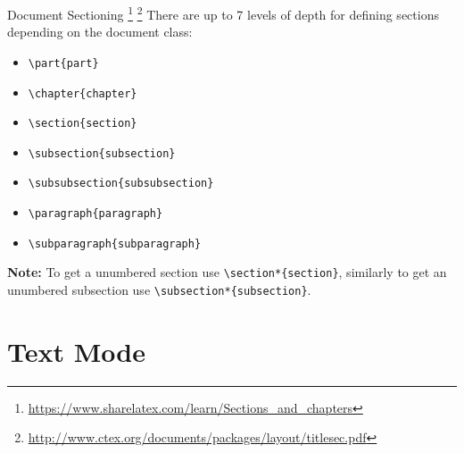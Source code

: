 \documentclass[10pt]{beamer}
\begin{document}
\begin{frame}[fragile]{Document Sectioning
\footnote{\url{https://www.sharelatex.com/learn/Sections_and_chapters}}
\footnote{\url{http://www.ctex.org/documents/packages/layout/titlesec.pdf}}}
 There are up to 7 levels of depth for defining sections depending on the document class:
\begin{itemize}
\item \verb|\part{part}|
\item \verb|\chapter{chapter}|
\item \verb|\section{section}|
\item \verb|\subsection{subsection}|
\item \verb|\subsubsection{subsubsection}|
\item \verb|\paragraph{paragraph}|
\item \verb|\subparagraph{subparagraph}|
\end{itemize}

\textbf{Note:} To get a unumbered section use \verb|\section*{section}|, similarly to get an unumbered subsection use \verb|\subsection*{subsection}|.
\end{frame}

\section{Text Mode}
\end{document}
